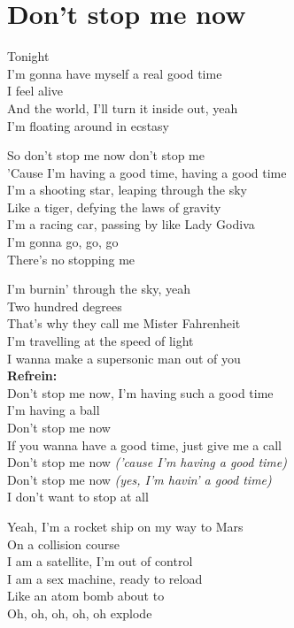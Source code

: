 \section{Don't stop me now}
Tonight\\
I'm gonna have myself a real good time\\
I feel alive\\
And the world, I'll turn it inside out, yeah\\
I'm floating around in ecstasy

So don't stop me now don't stop me\\
'Cause I'm having a good time, having a good time\\

I'm a shooting star, leaping through the sky\\
Like a tiger, defying the laws of gravity\\
I'm a racing car, passing by like Lady Godiva\\
I'm gonna go, go, go\\
There's no stopping me

I'm burnin' through the sky, yeah\\
Two hundred degrees\\
That's why they call me Mister Fahrenheit\\
I'm travelling at the speed of light\\
I wanna make a supersonic man out of you\\

\textbf{Refrein:}\\
Don't stop me now, I'm having such a good time\\
I'm having a ball\\
Don't stop me now\\
If you wanna have a good time, just give me a call\\
Don't stop me now \textit{('cause I'm having a good time)}\\
Don't stop me now \textit{(yes, I'm havin' a good time)}\\
I don't want to stop at all

Yeah, I'm a rocket ship on my way to Mars\\
On a collision course\\
I am a satellite, I'm out of control\\
I am a sex machine, ready to reload\\
Like an atom bomb about to\\
Oh, oh, oh, oh, oh explode

